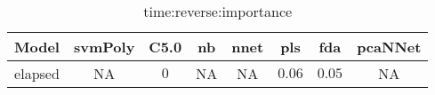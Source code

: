 \begin{table}[!ht]
	\centering
	\begin{tabular}{|c|c|c|c|c|c|c|c|}
		\hline
		Model & svmPoly & C5.0 & nb & nnet & pls & fda & pcaNNet \\ \hline
		elapsed & NA & $0$ & NA & NA & $0.06$ & $0.05$ & NA \\ \hline
	\end{tabular}
	\caption{time:reverse:importance}
	\label{tab:time:reverse:importance}
\end{table}
